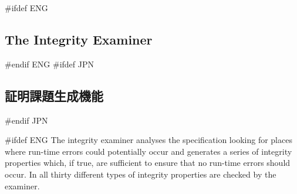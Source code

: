 \documentclass[\pformat,12pt]{article}
\newcommand{\guicmd}[1]{{\sf #1}}
\newcommand{\guicmd}[1]{{\gt #1}}
\begin{document}





\newpage
#ifdef ENG
\subsection{The Integrity Examiner}\label{sec:pog}
#endif ENG
#ifdef JPN
\subsection{証明課題生成機能}\label{sec:pog}
#endif JPN

#ifdef ENG
The integrity examiner analyses the specification looking for places
where run-time errors could potentially occur and generates a series
of integrity properties which, if true, are sufficient to ensure that
no run-time errors should occur. In all thirty different types of
integrity properties are checked by the examiner.
\end{document}
